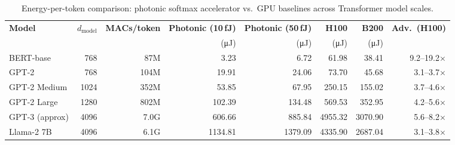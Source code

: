 \begin{table}[t]
\centering
\caption{Energy-per-token comparison: photonic softmax accelerator vs.\ GPU baselines across Transformer model scales.}
\label{tab:energy_scaling}
\small
\begin{tabular}{l r r r r r r r}
\hline
\textbf{Model} & \textbf{$d_\text{model}$} & \textbf{MACs/token} & \textbf{Photonic (10\,fJ)} & \textbf{Photonic (50\,fJ)} & \textbf{H100} & \textbf{B200} & \textbf{Adv.\ (H100)} \\
 & & & (\si{\micro\joule}) & (\si{\micro\joule}) & (\si{\micro\joule}) & (\si{\micro\joule}) & \\
\hline
  BERT-base & 768 & 87M & 3.23 & 6.72 & 61.98 & 38.41 & 9.2--19.2$\times$ \\
  GPT-2 & 768 & 104M & 19.91 & 24.06 & 73.70 & 45.68 & 3.1--3.7$\times$ \\
  GPT-2 Medium & 1024 & 352M & 53.85 & 67.95 & 250.15 & 155.02 & 3.7--4.6$\times$ \\
  GPT-2 Large & 1280 & 802M & 102.39 & 134.48 & 569.53 & 352.95 & 4.2--5.6$\times$ \\
  GPT-3 {\scriptsize(approx)} & 4096 & 7.0G & 606.66 & 885.84 & 4955.32 & 3070.90 & 5.6--8.2$\times$ \\
  Llama-2 7B & 4096 & 6.1G & 1134.81 & 1379.09 & 4335.90 & 2687.04 & 3.1--3.8$\times$ \\
\hline
\end{tabular}
\end{table}